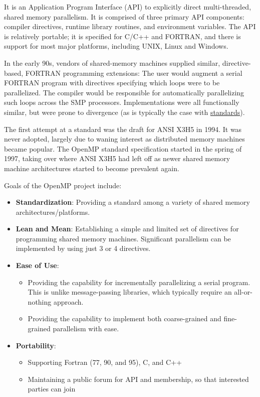 It is an Application Program Interface (API) to explicitly direct multi-threaded, shared memory parallelism. It is comprised of three primary API components: compiler directives, runtime library routines, and environment variables. The API is relatively portable; it is specified for C/C++ and FORTRAN, and there is support for most major platforms, including UNIX, Linux and Windows.

In the early 90s, vendors of shared-memory machines supplied similar, directive-based, FORTRAN programming extensions: The user would augment a serial FORTRAN program with directives specifying which loops were to be parallelized. The compiler would be responsible for automatically parallelizing such loops across the SMP processors. Implementations were all functionally similar, but were prone to divergence (as is typically the case with \href{https://xkcd.com/927/}{standards}).

The first attempt at a standard was the draft for ANSI X3H5 in 1994. It was never adopted, largely due to waning interest as distributed memory machines became popular. The OpenMP standard specification started in the spring of 1997, taking over where ANSI X3H5 had left off as newer shared memory machine architectures started to become prevalent again.

Goals of the OpenMP project include: \begin{itemize}
\item \textbf{Standardization}: Providing a standard among a variety of shared memory architectures/platforms.
\item \textbf{Lean and Mean}: Establishing a simple and limited set of directives for programming shared memory machines. Significant parallelism can be implemented by using just 3 or 4 directives.
\item \textbf{Ease of Use}:  \begin{itemize}
	\item Providing the capability for incrementally parallelizing a serial program. This is unlike message-passing libraries, which typically require an all-or-nothing approach.
	\item Providing the capability to implement both coarse-grained and fine-grained parallelism with ease.
\end{itemize}
\item \textbf{Portability}: \begin{itemize}
	\item Supporting Fortran (77, 90, and 95), C, and C++ 
	\item Maintaining a public forum for API and membership, so that interested parties can join
\end{itemize}
\end{itemize}

